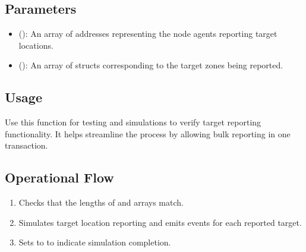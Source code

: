 \documentclass[a4paper,10pt,english]{sphinxmanual}
\begin{document}
\subsection{Parameters}
\label{\detokenize{docs_consensus_mechanism_contract:id7}}\begin{itemize}
\item {} 
\sphinxAtStartPar
{} ():
An array of addresses representing the node agents reporting target locations.

\item {} 
\sphinxAtStartPar
{} ():
An array of  structs corresponding to the target zones being reported.

\end{itemize}


\subsection{Usage}
\label{\detokenize{docs_consensus_mechanism_contract:id8}}
\sphinxAtStartPar
Use this function for testing and simulations to verify target reporting functionality. It helps streamline the process by allowing bulk reporting in one transaction.


\subsection{Operational Flow}
\label{\detokenize{docs_consensus_mechanism_contract:id9}}\begin{enumerate}
%
\item {} 
\sphinxAtStartPar
{} Checks that the lengths of  and  arrays match.

\item {} 
\sphinxAtStartPar
{} Simulates target location reporting and emits  events for each reported target.

\item {} 
\sphinxAtStartPar
{} Sets  to  to indicate simulation completion.

\end{enumerate}
\end{document}
